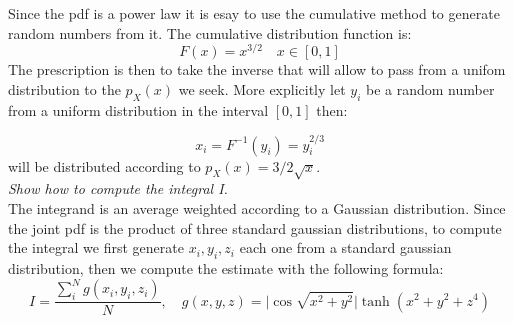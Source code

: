 \documentclass[10pt,a4paper]{report}
\begin{document}
Since the pdf is a power law it is esay to use the cumulative method to generate random numbers from it. The cumulative distribution function is:
\begin{equation}
F(x)=x^{3/2} \quad x \in [0,1]
\end{equation}
The prescription is then to take the inverse that will allow to pass from a unifom distribution to the $ p_{X}(x)$ we seek. More explicitly let $y_{i}$ be a random number from a uniform distribution in the interval $[0,1]$ then:

\begin{equation}
x_{i}=F^{-1}(y_{i})=y_{i}^{2/3}
\end{equation}
will be distributed according to $p_{X}(x)=3/2\sqrt{x}.$
\\
\textit{Show how to compute the integral I.}\\

The integrand is an average weighted according to a Gaussian distribution. Since the joint pdf is the product of three standard gaussian distributions, to compute the integral we first generate $x_{i}, y_{i}, z_{i}$ each one from a standard gaussian distribution, then we compute the estimate with the following formula:
\begin{equation}
I=\dfrac{\sum_{i}^{N }g(x_{i}, y_{i}, z_{i})}{N}, \quad g(x,y,z)=\vert \cos{\sqrt{x^{2}+y^{2}}} \vert \tanh{(x^{2}+y^{2}+z^{4})}
\end{equation} 
\end{document}
